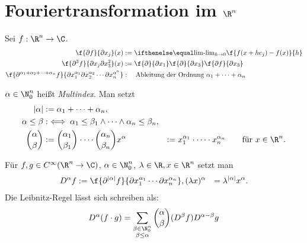 \section{Fouriertransformation im $\R^n$}


\begin{nt*}[Erinnerung]
	Sei $f : \R^n \to \C$.
	\begin{align*}
		\f{\partial f}{\partial x_j}(x) &:= \lim_{h\to 0} \f {f(x+he_j)-f(x)}{h} \\
		\f{\partial^3 f}{\partial x_j \partial x_3^2}(x) &:= \f{\partial }{\partial x_1}\f{\partial }{\partial x_3}\f{\partial f}{\partial x_3} \\
		\f{\partial^{\alpha_1 + \alpha_2 + \dotsb + \alpha_n} f}{\partial x_1^{\alpha_1} \partial x_2^{\alpha_2} \dotsb \partial x_n^{\alpha^n}}  &: \quad \text{Ableitung der Ordnung $\alpha_1 + \dotsb + \alpha_n$}
	\end{align*}
\end{nt*}

\begin{df} \label{4.27}
	$\alpha \in \N_0^n$ heißt \emph{Multindex}.
	Man setzt
	\begin{align*}
		|\alpha| &:= \alpha_1 + \dotsb + \alpha_n, \\
		\alpha \le \beta &:\iff \alpha_1 \le \beta_1 \land \dotsb \land \alpha_n \le \beta_n, \\
		\binom{\alpha}{\beta} &:= \binom{\alpha_1}{\beta_1} \cdot \dotsb \binom{\alpha_n}{\beta_n}
		x^\alpha &:= x_1^{\alpha_1} \cdot \dotsb \cdot x_n^{\alpha_n} \qquad \text{für $x\in \R^n$.}
	\end{align*}
\end{df}

\begin{ex}[Anwendung] \label{4.28}
	Für $f, g \in C^\infty (\R^n \to \C)$, $\alpha \in \N_0^n$, $\lambda \in \R, x \in \R^n$ setzt man
	\begin{align*}
		D^\alpha f &:= \f {\partial^{|\alpha|}f}{\partial x_1^{\alpha_1} \dotsb \partial x_n^{\alpha_n}},
		(\lambda x)^\alpha &= \lambda^{|\alpha|} x^\alpha.
	\end{align*}
	Die Leibnitz-Regel lässt sich schreiben als:
	\[
		D^\alpha(f\cdot g) = \sum_{\substack{\beta \in \N_0^n \\ \beta \le \alpha}} \binom{\alpha}{\beta} (D^\beta f)D^{\alpha - \beta} g
	\]
\end{ex}

